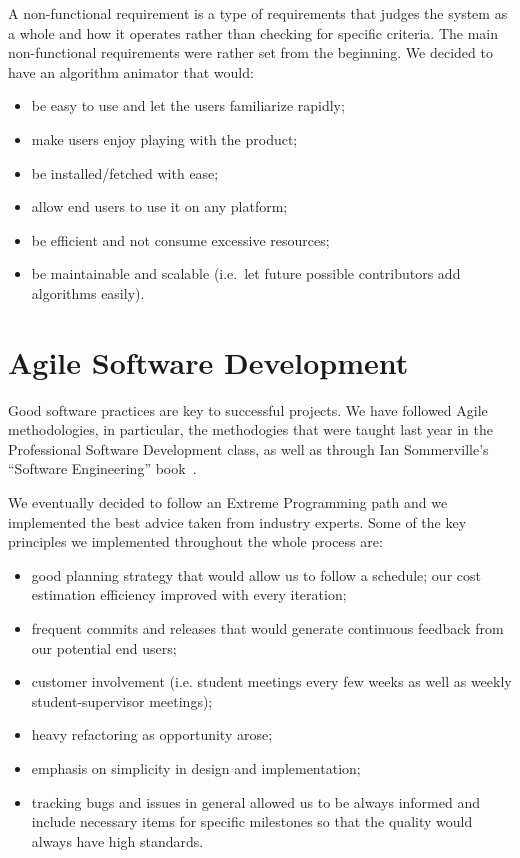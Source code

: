 \documentclass{l4proj}
\begin{document}
A non-functional requirement is a type of requirements that judges the system as a whole and how it operates rather than checking for specific criteria. The main non-functional requirements were rather set from the beginning. We decided to have an algorithm animator that would:

\begin{itemize}
\item be easy to use and let the users familiarize rapidly;
\item make users enjoy playing with the product;
\item be installed/fetched with ease;
\item allow end users to use it on any platform;
\item be efficient and not consume excessive resources;
\item be maintainable and scalable (i.e.\ let future possible contributors add algorithms easily).
\end{itemize}


\chapter{Agile Software Development}
\label{agile-software-development}

Good software practices are key to successful projects. We have followed Agile methodologies, in particular, the methodogies that were taught last year in the Professional Software Development class, as well as through Ian Sommerville's ``Software
Engineering'' book~\cite{software-engineering}.

We eventually decided to follow an Extreme Programming path and we implemented the best advice taken from industry
experts. Some of the key principles we implemented throughout the whole process are:
\begin{itemize}
    \item good planning strategy that would allow us to follow a schedule; our cost estimation efficiency improved
      with every iteration;
    \item frequent commits and releases that would generate continuous feedback from our potential end users;
    \item customer involvement (i.e. student meetings every few weeks as well as weekly student-supervisor
      meetings);
    \item heavy refactoring as opportunity arose;
    \item emphasis on simplicity in design and implementation;
    \item tracking bugs and issues in general allowed us to be always informed and include necessary items for
      specific milestones so that the quality would always have high standards.
\end{itemize}
\end{document}
